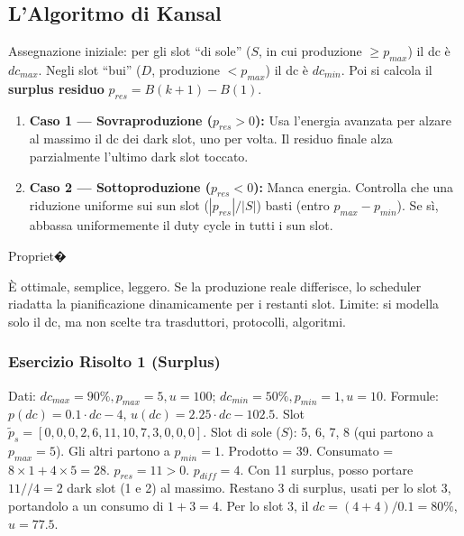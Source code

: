 \documentclass[
  italian,
  openany]{book}
\providecommand{\tightlist}{%
  \setlength{\itemsep}{0pt}\setlength{\parskip}{0pt}}
\begin{document}
\subsection{L'Algoritmo di Kansal}\label{lalgoritmo-di-kansal}

Assegnazione iniziale: per gli slot ``di sole'' (\(S\), in cui
produzione \(\ge p_{max}\)) il dc è \(dc_{max}\). Negli slot ``bui''
(\(D\), produzione \(< p_{max}\)) il dc è \(dc_{min}\). Poi si calcola
il \textbf{surplus residuo} \(p_{res} = B(k+1) - B(1)\).

\begin{enumerate}
\def\labelenumi{\arabic{enumi}.}
\tightlist
\item
  \textbf{Caso 1 --- Sovraproduzione (\(p_{res} > 0\)):} Usa l'energia
  avanzata per alzare al massimo il dc dei dark slot, uno per volta. Il
  residuo finale alza parzialmente l'ultimo dark slot toccato.
\item
  \textbf{Caso 2 --- Sottoproduzione (\(p_{res} < 0\)):} Manca energia.
  Controlla che una riduzione uniforme sui sun slot (\(|p_{res}|/|S|\))
  basti (entro \(p_{max} - p_{min}\)). Se sì, abbassa uniformemente il
  duty cycle in tutti i sun slot.
\end{enumerate}

\begin{callouttip}{Propriet�}

È ottimale, semplice, leggero. Se la produzione reale differisce, lo
scheduler riadatta la pianificazione dinamicamente per i restanti slot.
Limite: si modella solo il dc, ma non scelte tra trasduttori,
protocolli, algoritmi.

\end{callouttip}

\subsubsection{Esercizio Risolto 1
(Surplus)}\label{esercizio-risolto-1-surplus}

Dati: \(dc_{max}=90\%, p_{max}=5, u=100\);
\(dc_{min}=50\%, p_{min}=1, u=10\). Formule: \(p(dc)=0.1\cdot dc - 4\),
\(u(dc)=2.25\cdot dc - 102.5\). Slot
\(\tilde{p}_s = [0, 0, 0, 2, 6, 11, 10, 7, 3, 0, 0, 0]\). Slot di sole
(\(S\)): 5, 6, 7, 8 (qui partono a \(p_{max}=5\)). Gli altri partono a
\(p_{min}=1\). Prodotto = 39. Consumato =
\(8 \times 1 + 4 \times 5 = 28\). \(p_{res} = 11 > 0\).
\(p_{diff} = 4\). Con 11 surplus, posso portare \(11//4 = 2\) dark slot
(1 e 2) al massimo. Restano 3 di surplus, usati per lo slot 3,
portandolo a un consumo di \(1+3=4\). Per lo slot 3, il
\(dc = (4+4)/0.1 = 80\%\), \(u = 77.5\).
\end{document}
